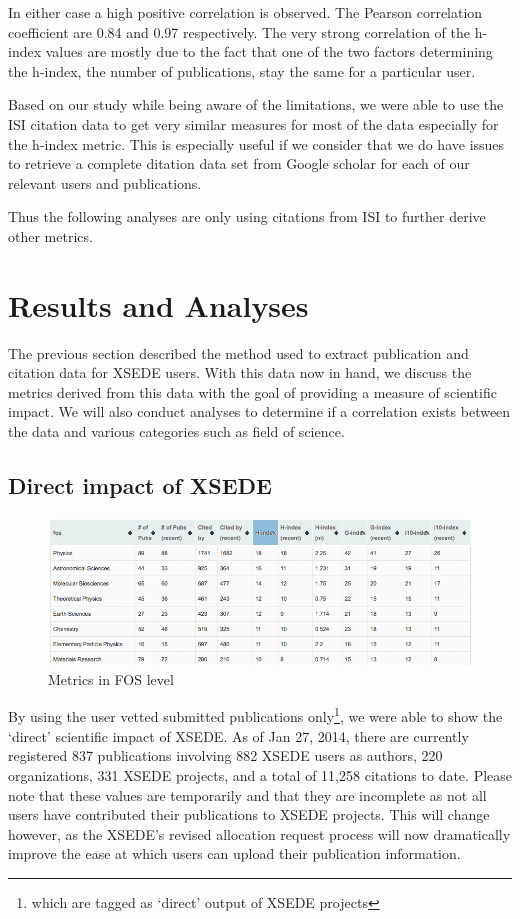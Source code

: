\documentclass{sig-alternate}
\begin{document}
In either case a high positive correlation is observed. The Pearson correlation coefficient are 0.84 and 0.97 respectively. The very strong correlation of the h-index values are mostly due to the fact that one of the two factors determining the h-index, the number of publications, stay the same for a particular user. 
 
Based on our study while being aware of the limitations, we were able to use the ISI citation data to get very similar measures for most of the data especially for the h-index metric. This is especially useful if we consider that we do have issues to retrieve a complete ditation data set from Google scholar for each of our relevant users and publications.

Thus the following analyses are only using citations from ISI to further derive other metrics. 
 
\section{Results and Analyses} \label{S:result}
 
The previous section described the method used to extract publication and citation data for XSEDE users.  With this data now in hand, we discuss the metrics derived from this data with the goal of providing a measure of scientific impact. We will also conduct analyses to determine if a correlation exists between the data and various categories such as field of science. 
 
\subsection{Direct impact of XSEDE} 
 
\begin{figure}[htb] 
  \centering 
    \includegraphics[width=1.0\columnwidth]{images/XDPUBS_Metrics_FOS.png} 
  \caption{Metrics in FOS level}\label{F:xdpubs-metrics-fos} 
\end{figure} 
 
By using the user vetted submitted publications only\footnote{which are tagged as `direct' output of XSEDE projects}, we were able to show the `direct' scientific impact of XSEDE.  As of Jan 27, 2014, there are currently registered 837 publications involving 882 XSEDE users as authors, 220 organizations, 331 XSEDE projects, and a total of 11,258 citations to date. Please note that these values are temporarily and that they are incomplete as not all users have contributed their publications to XSEDE projects.   This will change however, as the XSEDE’s revised allocation request process will now dramatically improve the ease at which users can upload their publication information.
\end{document}
